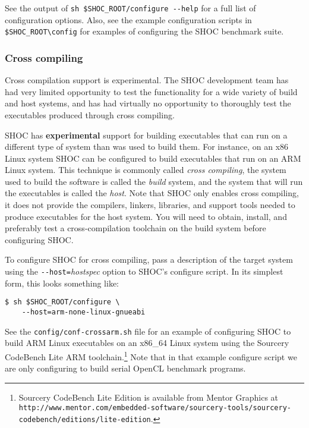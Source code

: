 \documentclass[11pt]{article}
\begin{document}
See the output of \verb+sh $SHOC_ROOT/configure --help+ for a full list of configuration 
options.
Also, see the example configuration scripts in \verb+$SHOC_ROOT\config+ for
examples of configuring the SHOC benchmark suite.

\subsubsection{Cross compiling}

\begin{framed}
Cross compilation support is experimental.
The SHOC development team has had very limited opportunity to test the
functionality for a wide variety of build and host systems, and has had
virtually no opportunity to thoroughly test the executables produced through
cross compiling.
\end{framed}

SHOC has {\bf experimental} support for building executables that can run on
a different type of system than was used to build them.
For instance, on an x86 Linux system SHOC can be configured to build 
executables that run on an ARM Linux system.
This technique is commonly called {\em cross compiling}, the system
used to build the software is called the {\em build} system, and the system
that will run the executables is called the {\em host}.
Note that SHOC only enables cross compiling, it does not provide
the compilers, linkers, libraries, and support tools needed to produce
executables for the host system.
You will need to obtain, install, and preferably test a cross-compilation
toolchain on the build system before configuring SHOC.

To configure SHOC for cross compiling, pass a description of the target
system using the \verb+--host=+{\em hostspec} option to SHOC's configure
script.
In its simplest form, this looks something like:
\begin{Verbatim}[frame=single]
$ sh $SHOC_ROOT/configure \
    --host=arm-none-linux-gnueabi
\end{Verbatim}
\noindent See the {\tt config/conf-crossarm.sh} file for an example of 
configuring SHOC to build ARM Linux executables on an x86\_64 Linux system
using the Sourcery CodeBench Lite ARM toolchain.\footnote{Sourcery CodeBench
Lite Edition is available from Mentor Graphics at 
{\tt http://www.mentor.com/embedded-software/sourcery-tools/sourcery-codebench/editions/lite-edition}.}
Note that in that example configure script we are only configuring to build
serial OpenCL benchmark programs.
\end{document}
